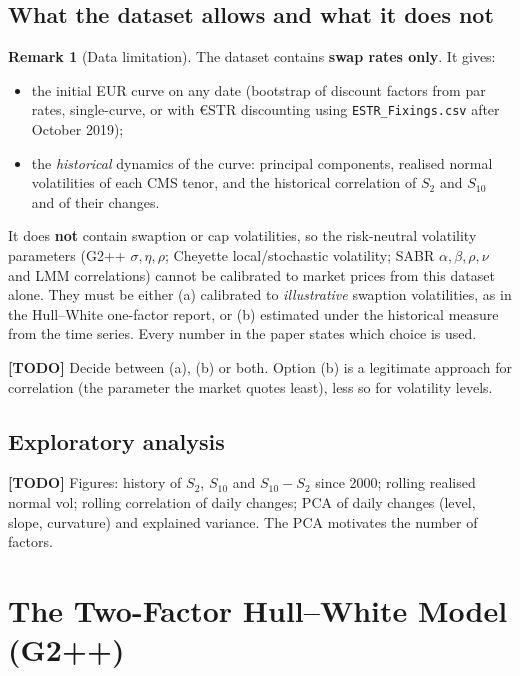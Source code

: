 \documentclass[11pt,a4paper]{article}
\theoremstyle{plain}
\theoremstyle{definition}
\newtheorem{remark}[theorem]{Remark}
\newcommand{\todo}[1]{\textcolor{red!70!black}{\textbf{[TODO]} #1}}
\begin{document}
\subsection{What the dataset allows and what it does not}
\begin{remark}[Data limitation]
\label{rem:data}
The dataset contains \textbf{swap rates only}. It gives:
\begin{itemize}
    \item the initial EUR curve on any date (bootstrap of discount factors from par rates, single-curve, or with €STR discounting using \texttt{ESTR\_Fixings.csv} after October 2019);
    \item the \emph{historical} dynamics of the curve: principal components, realised normal volatilities of each CMS tenor, and the historical correlation of $S_2$ and $S_{10}$ and of their changes.
\end{itemize}
It does \textbf{not} contain swaption or cap volatilities, so the risk-neutral volatility parameters (G2++ $\sigma,\eta,\rho$; Cheyette local/stochastic volatility; SABR $\alpha,\beta,\rho,\nu$ and LMM correlations) cannot be calibrated to market prices from this dataset alone. They must be either (a) calibrated to \emph{illustrative} swaption volatilities, as in the Hull--White one-factor report, or (b) estimated under the historical measure from the time series. Every number in the paper states which choice is used.
\end{remark}
\todo{Decide between (a), (b) or both. Option (b) is a legitimate approach for correlation (the parameter the market quotes least), less so for volatility levels.}

\subsection{Exploratory analysis}
\todo{Figures: history of $S_2$, $S_{10}$ and $S_{10}-S_2$ since 2000; rolling realised normal vol; rolling correlation of daily changes; PCA of daily changes (level, slope, curvature) and explained variance. The PCA motivates the number of factors.}

\clearpage
\section{The Two-Factor Hull--White Model (G2++)}
\label{sec:g2}
\end{document}
